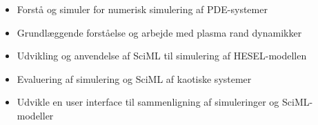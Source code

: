 \begin{itemize}
    \item Forstå og simuler for numerisk simulering af PDE-systemer
    \item Grundlæggende forståelse og arbejde med plasma rand dynamikker
    \item Udvikling og anvendelse af SciML til simulering af HESEL-modellen
    \item Evaluering af simulering og SciML af kaotiske systemer
    \item Udvikle en user interface til sammenligning af simuleringer og SciML-modeller
\end{itemize}
